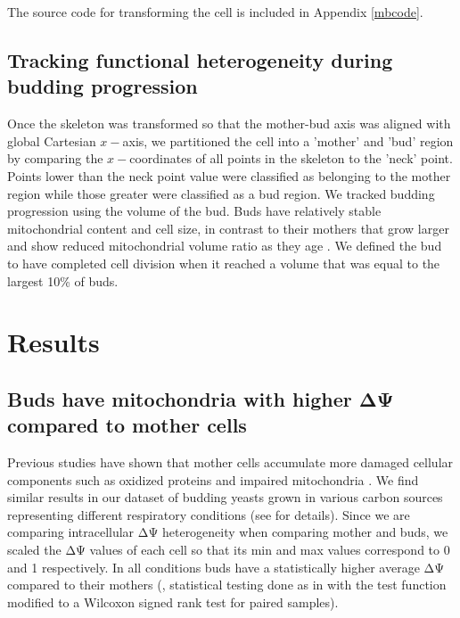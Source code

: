 The source code for transforming the cell is included in Appendix \ref{mbcode}.
\subsection{Tracking functional heterogeneity during budding progression}\label{sec:cellcycle}
Once the skeleton was transformed so that the mother-bud axis was aligned with global Cartesian $x-$axis, we partitioned the cell into a 'mother' and 'bud' region by comparing the $x-$coordinates of all points in the skeleton to the 'neck' point. Points lower than the neck point value were classified as belonging to the mother region while those greater were classified as a bud region. We tracked budding progression using the volume of the bud. Buds have relatively stable mitochondrial content and cell size, in contrast to their mothers that grow larger and show reduced mitochondrial volume ratio as they age \cite{rafelski_mitochondrial_2012}. We defined the bud to have completed cell division when it reached a volume that was equal to the largest 10\% of buds.
\section{Results}
\subsection{Buds have mitochondria with higher ΔΨ compared to mother cells}\label{sec:frady}
Previous studies have shown that mother cells accumulate more damaged cellular components such as oxidized proteins and impaired mitochondria \cite{aguilaniu_asymmetric_2003,lai_mutation_2002,laun_aged_2001}. We find similar results in our dataset of budding yeasts grown in various carbon sources representing different respiratory conditions (see  for details). Since we are comparing intracellular ΔΨ heterogeneity when comparing mother and buds, we scaled the ΔΨ values of each cell so that its min and max values correspond to 0 and 1 respectively. In all conditions buds have a statistically higher average ΔΨ compared to their mothers (, statistical testing done as in  with the test function modified to a Wilcoxon signed rank test for paired samples).
 
